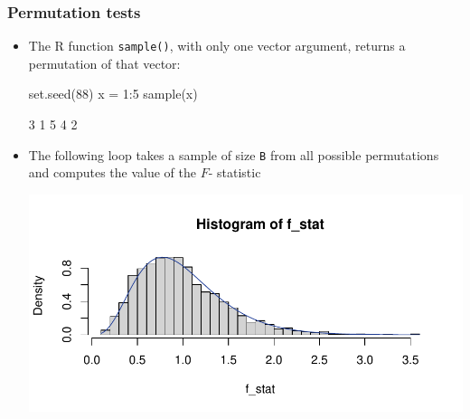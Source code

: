 \documentclass[a4paper]{article}\usepackage[]{graphicx}\usepackage[]{xcolor}
\makeatletter
\def\maxwidth{ %
  \ifdim\Gin@nat@width>\linewidth
    \linewidth
  \else
    \Gin@nat@width
  \fi
}
\makeatother
\begin{document}
\subsubsection{Permutation tests}
\begin{itemize}
	\item The R function \lstinline|sample()|, with only one vector argument, returns a permutation of that vector:
\begin{Schunk}
\begin{Sinput}
set.seed(88)
x = 1:5
sample(x)
\end{Sinput}
\begin{Soutput}
[1] 3 1 5 4 2
\end{Soutput}
\end{Schunk}
	\item The following loop takes a sample of size \lstinline|B| from all possible permutations and computes the value of the \( F \)- statistic
\begin{Schunk}


{\centering \includegraphics[width=\maxwidth]{figure/listings-unnamed-chunk-273-1} 

}


\end{Schunk}
\end{itemize}
\end{document}
